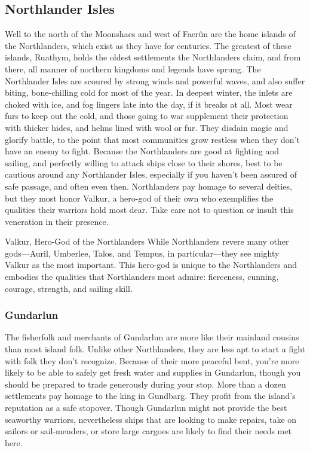 \documentclass[10pt,a4paper,twoside,twocolumn,openany,bg=print,nodeprecatedcode]{dndbook}
\begin{document}
\subsection{Northlander Isles}
Well to the north of the Moonshaes and west of Faerûn are the home islands of the Northlanders, which exist as they have for centuries. The greatest of these islands, Ruathym, holds the oldest settlements the Northlanders claim, and from there, all manner of northern kingdoms and legends have sprung.
The Northlander Isles are scoured by strong winds and powerful waves, and also suffer biting, bone-chilling cold for most of the year. In deepest winter, the inlets are choked with ice, and fog lingers late into the day, if it breaks at all. Most wear furs to keep out the cold, and those going to war supplement their protection with thicker hides, and helms lined with wool or fur. They disdain magic and glorify battle, to the point that most communities grow restless when they don't have an enemy to fight.
Because the Northlanders are good at fighting and sailing, and perfectly willing to attack ships close to their shores, best to be cautious around any Northlander Isles, especially if you haven't been assured of safe passage, and often even then.
Northlanders pay homage to several deities, but they most honor Valkur, a hero-god of their own who exemplifies the qualities their warriors hold most dear. Take care not to question or insult this veneration in their presence.
\begin{DndComment}{Valkur, Hero-God of the Northlanders}
While Northlanders revere many other gods—Auril, Umberlee, Talos, and Tempus, in particular—they see mighty Valkur as the most important. This hero-god is unique to the Northlanders and embodies the qualities that Northlanders most admire: fierceness, cunning, courage, strength, and sailing skill.
\end{DndComment}

\subsubsection{Gundarlun}
The fisherfolk and merchants of Gundarlun are more like their mainland cousins than most island folk. Unlike other Northlanders, they are less apt to start a fight with folk they don't recognize. Because of their more peaceful bent, you're more likely to be able to safely get fresh water and supplies in Gundarlun, though you should be prepared to trade generously during your stop.
More than a dozen settlements pay homage to the king in Gundbarg. They profit from the island's reputation as a safe stopover. Though Gundarlun might not provide the best seaworthy warriors, nevertheless ships that are looking to make repairs, take on sailors or sail-menders, or store large cargoes are likely to find their needs met here.
\end{document}
